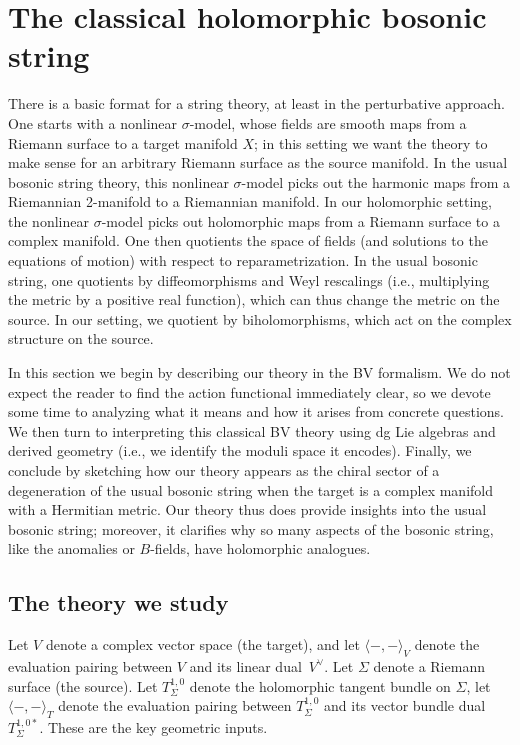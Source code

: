 \section{The classical holomorphic bosonic string} \label{sec:classical}

There is a basic format for a string theory, at least in the perturbative approach. 
One starts with a nonlinear $\sigma$-model, 
whose fields are smooth maps from a Riemann surface to a target manifold $X$;
in this setting we want the theory to make sense for an arbitrary Riemann surface as the source manifold.
In the usual bosonic string theory, 
this nonlinear $\sigma$-model picks out the harmonic maps from a Riemannian 2-manifold to a Riemannian manifold.
In our holomorphic setting,
the nonlinear $\sigma$-model picks out holomorphic maps from a Riemann surface to a complex manifold.
One then quotients the space of fields (and solutions to the equations of motion) with respect to reparametrization.
In the usual bosonic string,
one quotients by diffeomorphisms and Weyl rescalings (i.e., multiplying the metric by a positive real function), 
which can thus change the metric on the source.
In our setting, we quotient by biholomorphisms, which act on the complex structure on the source.

In this section we begin by describing our theory in the BV formalism.
We do not expect the reader to find the action functional immediately clear,
so we devote some time to analyzing what it means and how it arises from concrete questions.
We then turn to interpreting this classical BV theory using dg Lie algebras and derived geometry
(i.e., we identify the moduli space it encodes).
Finally, we conclude by sketching how our theory appears as the chiral sector of a degeneration of the usual bosonic string when the target is a complex manifold with a Hermitian metric.
Our theory thus does provide insights into the usual bosonic string;
moreover, it clarifies why so many aspects of the bosonic string,
like the anomalies or $B$-fields, 
have holomorphic analogues.

\subsection{The theory we study} 

Let $V$ denote a complex vector space (the target),
and let $\langle-,-\rangle_V$ denote the evaluation pairing between $V$ and its linear dual~$V^\vee$.
Let $\Sigma$ denote a Riemann surface (the source).
Let $T_\Sigma^{1,0}$ denote the holomorphic tangent bundle on $\Sigma$, 
let $\langle-,-\rangle_T$ denote the evaluation pairing between $T_\Sigma^{1,0}$ and its vector bundle dual~$T_\Sigma^{1,0*}$. 
These are the key geometric inputs.

